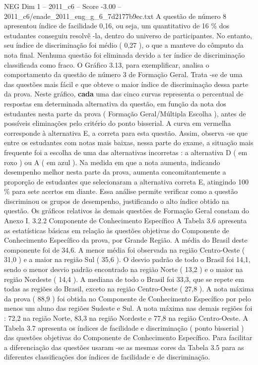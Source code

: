 \begin{textsample}{NEG Dim 1 – 2011\_c6 – Score -3.00 – 2011\_c6/enade\_2011\_eng\_g\_6\_7d2177b9ec.txt}
A questão de número 8 apresentou índice de facilidade 0,16, ou seja, um quantitativo de 16 \% dos estudantes conseguiu resolvê -la, dentro do universo de participantes.
No entanto, seu índice de discriminação foi médio ( 0,27 ), o que a manteve do cômputo da nota final.
Nenhuma questão foi eliminada devido a ter índice de discriminação classificada como fraco.
O Gráfico 3.13, para exemplificar, analisa o comportamento da questão de número 3 de Formação Geral.
Trata -se de uma das questões mais fácil e que obteve o maior índice de discriminação dessa parte da prova.
Neste gráfico, \textbf{cada} uma das cinco curvas representa o percentual de respostas em determinada alternativa da questão, em função da nota dos estudantes nesta parte da prova ( Formação Geral/Múltipla Escolha ), antes de possíveis eliminações pelo critério do ponto bisserial.
A curva em vermelha corresponde à alternativa E, a correta para esta questão.
Assim, observa -se que entre os estudantes com notas mais baixas, nessa parte do exame, a situação mais frequente foi a escolha de uma das alternativas incorretas : a alternativa D ( em roxo ) ou A ( em azul ).
Na medida em que a nota aumenta, indicando desempenho melhor nesta parte da prova, aumenta concomitantemente a proporção de estudantes que selecionaram a alternativa correta E, atingindo 100 \% para sete acertos em diante.
Essa análise permite verificar como a questão discriminou os grupos de desempenho, justificando o alto índice obtido na questão.
Os gráficos relativos às demais questões de Formação Geral constam do Anexo I. 3.2.2 Componente de Conhecimento Específico A Tabela 3.6 apresenta as estatísticas básicas em relação às questões objetivas do Componente de Conhecimento Específico da prova, por Grande Região.
A média do Brasil deste componente foi de 34,6.
A menor média foi observada na região Centro-Oeste ( 31,0 ) e a maior na região Sul ( 35,6 ).
O desvio padrão de todo o Brasil foi 14,1, sendo o menor desvio padrão encontrado na região Norte ( 13,2 ) e o maior na região Nordeste ( 14,4 ).
A mediana de todo o Brasil foi 33,3, que se repete em todas as regiões do Brasil, exceto na região Centro-Oeste ( 27,8 ).
A nota máxima da prova ( 88,9 ) foi obtida no Componente de Conhecimento Específico por pelo menos um aluno das regiões Sudeste e Sul.
A nota máxima nas demais regiões foi : 72,2 na região Norte, 83,3 na região Nordeste e 77,8 na região Centro-Oeste.
A Tabela 3.7 apresenta os índices de facilidade e discriminação ( ponto bisserial ) das questões objetivas do Componente de Conhecimento Específico.
Para facilitar a diferenciação das questões usaram -se as mesmas cores da Tabela 3.5 para as diferentes classificações dos índices de facilidade e de discriminação.

\end{textsample}
